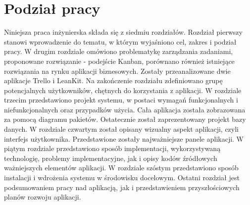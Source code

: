  \section{Podział pracy}
Niniejsza praca inżynierska składa się z siedmiu rozdziałów. Rozdział pierwszy stanowi wprowadzenie do tematu, w którym wyjaśniono cel, zakres i podział pracy. W drugim rozdziale omówiono problematykę zarządzania zadaniami, proponowane rozwiązanie - podejście Kanban, porównano również istniejące rozwiązania na rynku aplikacji biznesowych. Zostały przeanalizowane dwie aplikacje Trello i LeanKit. Na zakończenie rozdziału zdefiniowano grupę potencjalnych użytkowników, chętnych do korzystania z aplikacji. W rozdziale trzecim przedstawiono projekt systemu, w postaci wymagań funkcjonalnych i niefunkcjonalnych oraz przypadków użycia. Cała aplikacja została zobrazowana za pomocą diagramu pakietów. Ostatecznie został zaprezentowany projekt bazy danych. W rozdziale czwartym został opisany wizualny aspekt aplikacji, czyli interfejs użytkownika. Przedstawione zostały najważniejsze panele aplikacji. W piątym rozdziale przedstawiono sposób implementacji, wykorzystywaną technologię, problemy implementacyjne, jak i opisy kodów źródłowych ważniejszych elementów aplikacji. W rozdziale szóstym przedstawiono sposób instalacji i wdrożenia systemu w środowisku docelowym. Ostatni rozdział jest podsumowaniem pracy nad aplikacją, jak i przedstawieniem przyszłościowych planów rozwoju aplikacji. 

